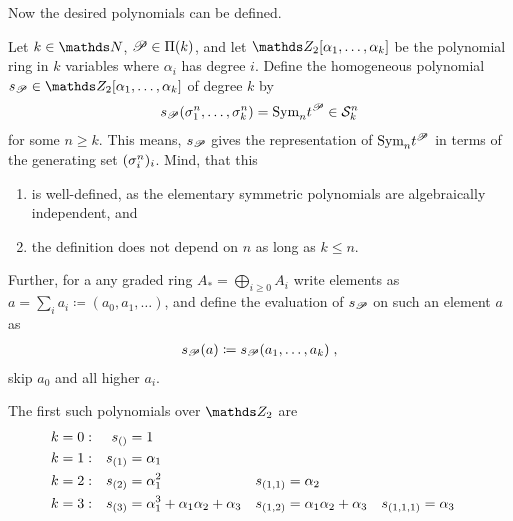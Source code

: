 Now the desired polynomials can be defined.
\begin{Def}
  Let $k\in\Nat$, $\mathscr{P}\in\Pi({k})$, and let
  $\Zmod2[\alpha_1,\dotsc,\alpha_k]$ be the polynomial ring in $k$
  variables where $\alpha_i$ has degree $i$.
  Define the homogeneous polynomial
  $\s{\Part}\in\Zmod2[\alpha_1,\dotsc,\alpha_k]$ of degree $k$ by
  \begin{gather*}
    s_{\mathscr{P}}(\sigma_{1}^{n},\dotsc, \sigma_{k}^{n}) = \text{\normalfont Sym}_{n} t^{\mathscr{P}} \in \mathcal{S}^{n}_k
  \end{gather*}
  for some $n\geq k$. This means, $s_{\mathscr{P}}$ gives the representation
  of $\text{\normalfont Sym}_{n}t^{\mathscr{P}}$ in terms of the generating set $(\sigma_{i}^{n})_i$.
  Mind, that this
  \begin{enumerate}
  \item is well-defined, as the elementary symmetric
    polynomials are algebraically independent, and
  \item the definition does not depend on $n$ as long as $k\leq n$.
  \end{enumerate}
  Further, for a any graded ring $A_*=\bigoplus_{i\geq 0} A_i$ write
  elements as $a=\sum_i a_i \coloneqq (a_0,a_1,\dotsc)$, and define
  the evaluation of $s_{\mathscr{P}}$ on such an element $a$ as
  \begin{gather*}
    s_{\mathscr{P}}(a) \coloneqq s_{\mathscr{P}}(a_1,\dotsc,a_k)
    \;,
  \end{gather*}
  \idest skip $a_0$ and all higher $a_i$.
\end{Def}

\begin{Ex}
  The first such polynomials over $\Zmod2$ are
  \begin{align*}
    k&=0:
    &s_{()} &= 1
    \\ k&=1:
    &s_{(1)} &= \alpha_1
    \\ k&=2:
    &s_{(2)} &= \alpha_1^2
        &s_{(1,1)} &= \alpha_2
    \\ k&=3:
    &s_{(3)} &= \alpha_1^3 + \alpha_1\alpha_2 + \alpha_3
        &s_{(1,2)} &= \alpha_1\alpha_2 + \alpha_3
             &s_{(1,1,1)} &= \alpha_3
  \end{align*}
  \cite[p.~90]{milnorlectures}
\end{Ex}

